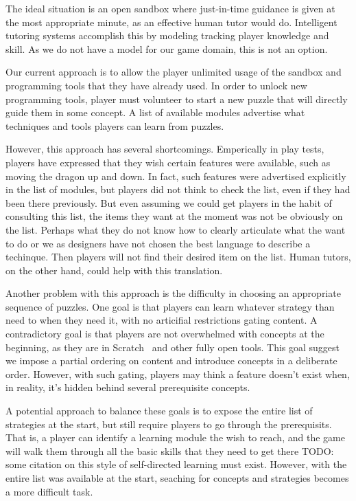 \documentclass{sig-alternate}
\newcommand{\TODO}[1]{{\color{red} TODO: #1}}
\begin{document}
The ideal situation is an open sandbox where just-in-time guidance is given at the most appropriate minute, as an effective human tutor would do.
Intelligent tutoring systems accomplish this by modeling tracking player knowledge and skill.
As we do not have a model for our game domain, this is not an option.

Our current approach is to allow the player unlimited usage of the sandbox and programming tools that they have already used.
In order to unlock new programming tools, player must volunteer to start a new puzzle that will directly guide them in some concept.
A list of available modules advertise what techniques and tools players can learn from puzzles.

However, this approach has several shortcomings.
Emperically in play tests, players have expressed that they wish certain features were available, such as moving the dragon up and down.
In fact, such features were advertised explicitly in the list of modules, but players did not think to check the list, even if they had been there previously.
But even assuming we could get players in the habit of consulting this list, the items they want at the moment was not be obviously on the list.
Perhaps what they do not know how to clearly articulate what the want to do or we as designers have not chosen the best language to describe a techinque.
Then players will not find their desired item on the list.
Human tutors, on the other hand, could help with this translation.

Another problem with this approach is the difficulty in choosing an appropriate sequence of puzzles.
One goal is that players can learn whatever strategy than need to when they need it, with no articifial restrictions gating content.
A contradictory goal is that players are not overwhelmed with concepts at the beginning, as they are in Scratch~\cite{resnick2009scratch} and other fully open tools.
This goal suggest we impose a partial ordering on content and introduce concepts in a deliberate order.
However, with such gating, players may think a feature doesn't exist when, in reality, it's hidden behind several prerequisite concepts.

A potential approach to balance these goals is to expose the entire list of strategies at the start, but still require players to go through the prerequisits.
That is, a player can identify a learning module the wish to reach, and the game will walk them through all the basic skills that they need to get there \TODO{some citation on this style of self-directed learning must exist}.
However, with the entire list was available at the start, seaching for concepts and strategies becomes a more difficult task.
\end{document}
